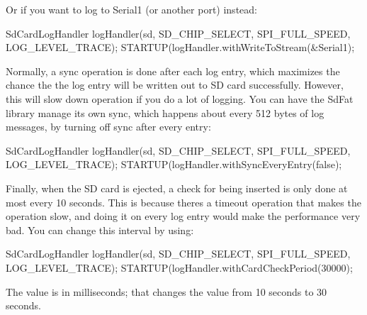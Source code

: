 Or if you want to log to Serial1 (or another port) instead\+:


\begin{DoxyCode}
SdCardLogHandler logHandler(sd, SD\_CHIP\_SELECT, SPI\_FULL\_SPEED, LOG\_LEVEL\_TRACE);
STARTUP(logHandler.withWriteToStream(&Serial1);
\end{DoxyCode}


Normally, a sync operation is done after each log entry, which maximizes the chance the the log entry will be written out to SD card successfully. However, this will slow down operation if you do a lot of logging. You can have the Sd\+Fat library manage its own sync, which happens about every 512 bytes of log messages, by turning off sync after every entry\+:


\begin{DoxyCode}
SdCardLogHandler logHandler(sd, SD\_CHIP\_SELECT, SPI\_FULL\_SPEED, LOG\_LEVEL\_TRACE);
STARTUP(logHandler.withSyncEveryEntry(false);
\end{DoxyCode}


Finally, when the SD card is ejected, a check for being inserted is only done at most every 10 seconds. This is because there\textquotesingle{}s a timeout operation that makes the operation slow, and doing it on every log entry would make the performance very bad. You can change this interval by using\+:


\begin{DoxyCode}
SdCardLogHandler logHandler(sd, SD\_CHIP\_SELECT, SPI\_FULL\_SPEED, LOG\_LEVEL\_TRACE);
STARTUP(logHandler.withCardCheckPeriod(30000);
\end{DoxyCode}


The value is in milliseconds; that changes the value from 10 seconds to 30 seconds. 